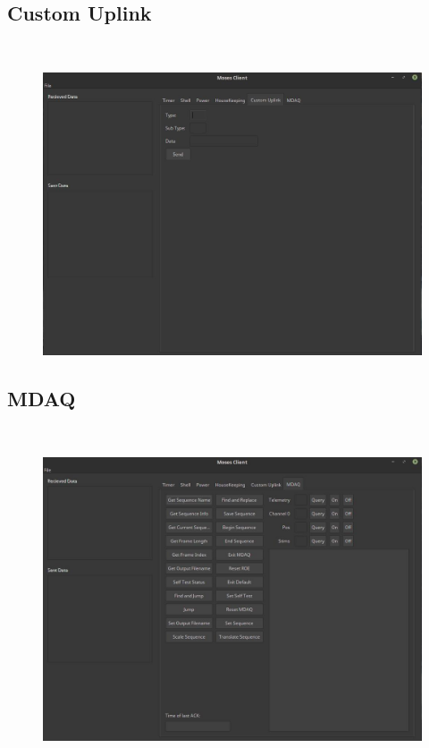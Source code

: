 \documentclass[11pt,titlepage]{article}
\begin{document}
	\newpage
	\subsection{Custom Uplink}
	\hrulefill
	\\
	
	\begin{figure}[h]
		\includegraphics[width=\textwidth]{EGSE_client_custom_uplink}
	\end{figure}
	
	\newpage
	\subsection{MDAQ}
	\hrulefill
	\\
	
	\begin{figure}[h]
		\includegraphics[width=\textwidth]{EGSE_client_mdaq}
	\end{figure}
	
\end{document}

